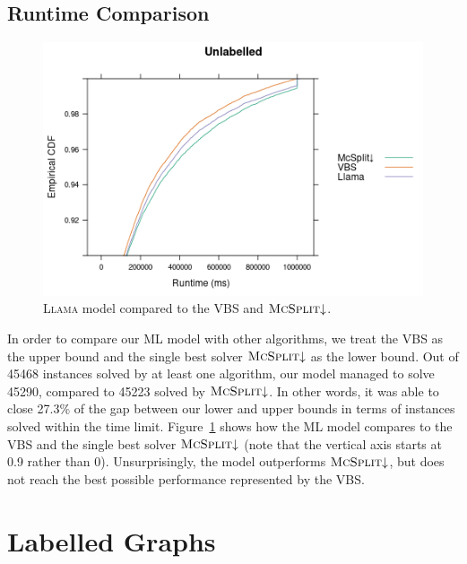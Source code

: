 \documentclass{l4proj}
\theoremstyle{definition}
\theoremstyle{remark}
\begin{document}
\subsection{Runtime Comparison}

\begin{figure}
  \centering
  \includegraphics[scale=0.5]{images/ecdf_unlabelled_llama.png}
  \caption{\textsc{Llama} model compared to the VBS and
    $\textsc{McSplit}{\downarrow}$.}
  \label{fig:ecdf_unlabelled_llama}
\end{figure}

In order to compare our ML model with other algorithms, we treat the
VBS as the upper bound and the single best solver $\textsc{McSplit}{\downarrow}$
as the lower bound. Out of 45468 instances solved by at least one algorithm, our
model managed to solve 45290, compared to 45223 solved by
$\textsc{McSplit}{\downarrow}$. In other words, it was able to close 27.3\% of the
gap between our lower and upper bounds in terms of instances solved within the
time limit. Figure~\ref{fig:ecdf_unlabelled_llama} shows how the ML model
compares to the VBS and the single best solver $\textsc{McSplit}{\downarrow}$
(note that the vertical axis starts at 0.9 rather than 0). Unsurprisingly, the
model outperforms $\textsc{McSplit}{\downarrow}$, but does not reach the best
possible performance represented by the VBS.

\section{Labelled Graphs} \label{sec:ml_labelled}
\end{document}
